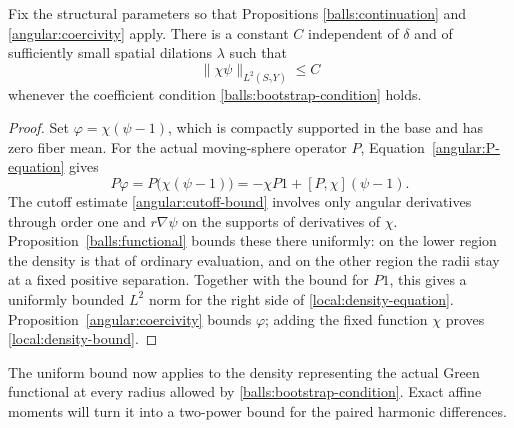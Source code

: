 \begin{lemma}\label{local:density}
Fix the structural parameters so that Propositions
\ref{balls:continuation} and \ref{angular:coercivity} apply.  There is
a constant $C$ independent of $\delta$ and of sufficiently small
spatial dilations $\lambda$ such that
\begin{equation}\label{local:density-bound}
 \|\chi\psi\|_{L^2(S_\gamma Y)}\leq C
\end{equation}
whenever the coefficient condition
\eqref{balls:bootstrap-condition} holds.
\end{lemma}

\begin{proof}
Set $\varphi=\chi(\psi-1)$, which is compactly supported in the base
and has zero fiber mean.  For the actual moving-sphere operator $P$,
Equation~\eqref{angular:P-equation} gives
\begin{equation}\label{local:density-equation}
 P\varphi=P\bigl(\chi(\psi-1)\bigr)
       =-\chi P1+[P,\chi](\psi-1).
\end{equation}
The cutoff estimate \eqref{angular:cutoff-bound} involves only angular
derivatives through order one and $r\nabla\psi$ on the supports of
derivatives of $\chi$.  Proposition~\ref{balls:functional} bounds
these there uniformly: on the lower region the density is that of
ordinary evaluation, and on the other region the radii stay at a fixed
positive separation.  Together with the bound for $P1$, this gives a
uniformly bounded $L^2$ norm for the right side of
\eqref{local:density-equation}.
Proposition~\ref{angular:coercivity} bounds $\varphi$; adding the fixed
function $\chi$ proves \eqref{local:density-bound}.
\end{proof}

The uniform bound now applies to the density representing the actual
Green functional at every radius allowed by
\eqref{balls:bootstrap-condition}.  Exact affine moments will turn it
into a two-power bound for the paired harmonic differences.
